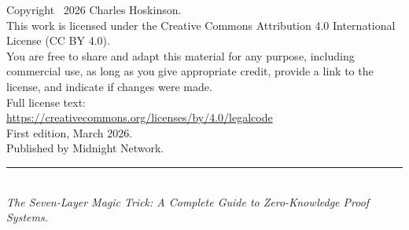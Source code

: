 
\newpage
\thispagestyle{empty}

\vspace*{\fill}

\begin{center}
\begin{minipage}{0.75\textwidth}

{\small\color{MidnightMuted}

\noindent Copyright \textcopyright\ 2026 Charles Hoskinson.\\[1.5em]

\noindent This work is licensed under the Creative Commons Attribution 4.0
International License (CC BY 4.0).\\[1em]

\noindent You are free to share and adapt this material for any purpose,
including commercial use, as long as you give appropriate credit, provide
a link to the license, and indicate if changes were made.\\[1em]

\noindent Full license text:\\
{\color{MidnightPurple}\url{https://creativecommons.org/licenses/by/4.0/legalcode}}\\[2em]

\noindent First edition, March 2026.\\[0.5em]
\noindent Published by Midnight Network.\\[2em]

{\color{MidnightGrey}\rule{0.3\textwidth}{0.5pt}}\\[1em]

\noindent\textit{The Seven-Layer Magic Trick: A Complete Guide to Zero-Knowledge Proof Systems.}

}

\end{minipage}
\end{center}

\vspace*{\fill}

\newpage
